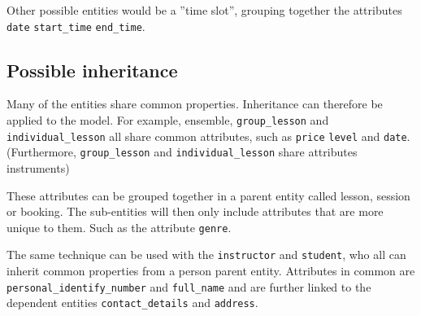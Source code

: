 \documentclass[a4paper]{scrartcl}
\begin{document}
Other possible entities would be a ''time slot'', grouping 
together the attributes
\verb|date|
\verb|start_time|
\verb|end_time|.

\subsection*{Possible inheritance}
Many of the entities share common properties. 
Inheritance can therefore be applied to the model. 
For example, 
ensemble, 
\verb|group_lesson| and 
\verb|individual_lesson| 
all share common attributes, such as 
\verb|price|
\verb|level| and 
\verb|date|. 
(Furthermore, 
\verb|group_lesson| and 
\verb|individual_lesson| share attributes instruments)

These attributes can be grouped together
in a parent entity called lesson, session or booking. 
The sub-entities will then only include attributes that are more
unique to them. 
Such as the attribute
\verb|genre|.

The same technique can be used with the 
\verb|instructor| and 
\verb|student|,
who all can inherit common properties from a 
person 
parent entity. 
Attributes in common are 
\verb|personal_identify_number| and 
\verb|full_name| 
and are further linked to the dependent entities 
\verb|contact_details|
and 
\verb|address|.




\end{document}
